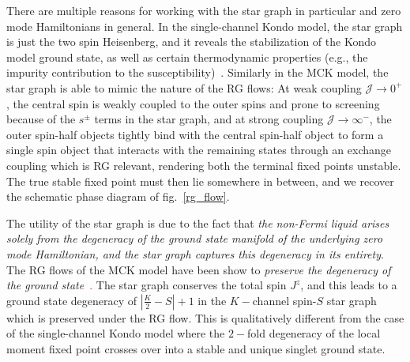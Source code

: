 \documentclass[reprint,prb,superscriptaddress]{revtex4-2}
\begin{document}
There are multiple reasons for working with the star graph in particular and zero mode Hamiltonians in general. In the single-channel Kondo model, the star graph is just the two spin Heisenberg, and it reveals the stabilization of the Kondo model ground state, as well as certain thermodynamic properties (e.g., the impurity contribution to the susceptibility)~\cite{varma_yafet_1976,yosida_1966,wilson1975renormalization,moca_zarand_2021,varma_yafet_1976,kondo_urg}. Similarly in the MCK model, the star graph is able to mimic the nature of the RG flows: At weak coupling \({\mathcal{J}} \to 0^+\), the central spin is weakly coupled to the outer spins and  prone to screening because of the \(s^\pm\) terms in the star graph, and at strong coupling \({\mathcal{J}} \to \infty^-\), the outer spin-half objects tightly bind with the central spin-half object to form a single spin object that interacts with the remaining states through an exchange coupling which is RG relevant, rendering both the terminal fixed points unstable. The true stable fixed point must then lie somewhere in between, and we recover the schematic phase diagram of fig.~\ref{rg_flow}. 

The utility of the star graph is due to the fact that \textit{the non-Fermi liquid arises solely from the degeneracy of the ground state manifold of the underlying zero mode Hamiltonian, and the star graph captures this degeneracy in its entirety}. The RG flows of the MCK model have been show to \textit{preserve the degeneracy of the ground state}~\cite{pang_cox_1991,kroha_kolf_2007,zitko_fabrizio_2017}\textcolor{red}. The star graph conserves the total spin \(J^z\), and this leads to a ground state degeneracy of \(|\frac{K}{2}-S|+1\) in the \(K-\)channel spin-\(S\) star graph which is preserved under the RG flow. This is qualitatively different from the case of the single-channel Kondo model where the \(2-\)fold degeneracy of the local moment fixed point crosses over into a stable and unique singlet ground state. 
\end{document}
